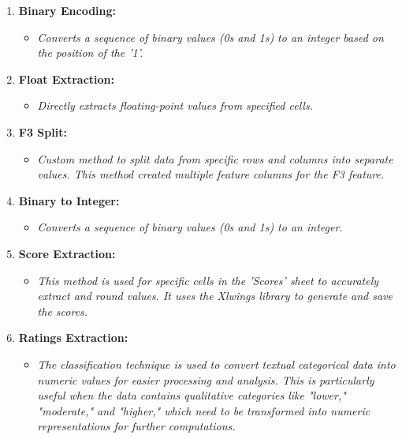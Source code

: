 \documentclass[12pt,letterpaper]{article}
\begin{document}
\begin{enumerate}
    \item \textbf{Binary Encoding:}
    \begin{itemize}
        \item \emph{Converts a sequence of binary values (0s and 1s) to an integer based on the position of the '1'.} 
    \end{itemize}

    \item \textbf{Float Extraction:}
    \begin{itemize}
        \item \emph{Directly extracts floating-point values from specified cells.} 
    \end{itemize}

    \item \textbf{F3 Split:}
    \begin{itemize}
        \item \emph{Custom method to split data from specific rows and columns into separate values. This method created multiple feature columns for the F3 feature.} 
    \end{itemize}

    \item \textbf{Binary to Integer:}
    \begin{itemize}
        \item \emph{Converts a sequence of binary values (0s and 1s) to an integer.} 
    \end{itemize}

    \item \textbf{Score Extraction:}
    \begin{itemize}
        \item \emph{This method is used for specific cells in the 'Scores' sheet to accurately extract and round values. It uses the Xlwings library to generate and save the scores.} 
    \end{itemize}

    \item \textbf{Ratings Extraction:}
    \begin{itemize}
        \item \emph{The classification technique is used to convert textual categorical data into numeric values for easier processing and analysis. This is particularly useful when the data contains qualitative categories like "lower," "moderate," and "higher," which need to be transformed into numeric representations for further computations.} 
    \end{itemize}
    
\end{enumerate}
\end{document}
